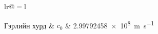 \addchaptertocentry{\constantsname}

\begin{constants}{lr@{${}={}$}l} %


	Гэрлийн хурд & $c_{0}$ & \SI{2.99792458e8}{\meter\per\second} \\

\addtocounter{table}{-1}\end{constants}
 
